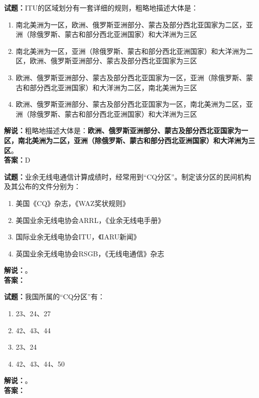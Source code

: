 \documentclass{ctexbook}
\begin{document}
\noindent\textbf{试题：}ITU的区域划分有一套详细的规则，粗略地描述大体是：
\begin{enumerate}[leftmargin=3em]
  \item 南北美洲为一区，欧洲、俄罗斯亚洲部分、蒙古及部分西北亚国家为二区，亚洲（除俄罗斯、蒙古和部分西北亚洲国家）和大洋洲为三区
  \item 南北美洲为一区，亚洲（除俄罗斯、蒙古和部分西北亚洲国家）和大洋洲为二区，欧洲、俄罗斯亚洲部分、蒙古及部分西北亚国家为三区
  \item 欧洲、俄罗斯亚洲部分、蒙古及部分西北亚国家为一区，亚洲（除俄罗斯、蒙古和部分西北亚洲国家）和大洋洲为二区，南北美洲为三区%
  \item 欧洲、俄罗斯亚洲部分、蒙古及部分西北亚国家为一区，南北美洲为二区，亚洲（除俄罗斯、蒙古和部分西北亚洲国家）和大洋洲为三区
\end{enumerate}
\noindent\textbf{解说：}粗略地描述大体是：\textbf{欧洲、俄罗斯亚洲部分、蒙古及部分西北亚国家为一区，南北美洲为二区，亚洲（除俄罗斯、蒙古和部分西北亚洲国家）和大洋洲为三区}。\\\noindent\textbf{答案：}D

\bigskip

\noindent\textbf{试题：}业余无线电通信计算成绩时，经常用到“CQ分区”。制定该分区的民间机构及其公布的文件分别为：
\begin{enumerate}[leftmargin=3em]
  \item 美国《CQ》杂志，《WAZ奖状规则》
  \item 美国业余无线电协会ARRL，《业余无线电手册》
  \item 国际业余无线电协会ITU，《IARU新闻》
  \item 英国业余无线电协会RSGB，《无线电通信》杂志
\end{enumerate}
\noindent\textbf{解说：}\textbf{}。\\\noindent\textbf{答案：}

\bigskip

\noindent\textbf{试题：}我国所属的“CQ分区”有：
\begin{enumerate}[leftmargin=3em]
  \item 23、24、27
  \item 42、43、44
  \item 23、24
  \item 42、43、44、50
\end{enumerate}
\noindent\textbf{解说：}\textbf{}。\\\noindent\textbf{答案：}

\bigskip
\end{document}
